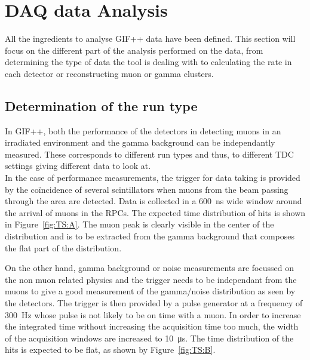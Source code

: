 \section{DAQ data Analysis}
\label{app2:sec:analysis}

	All the ingredients to analyse GIF++ data have been defined. This section will focus on the different part of the analysis performed on the data, from determining the type of data the tool is dealing with to calculating the rate in each detector or reconstructing muon or gamma clusters.

	\subsection{Determination of the run type}
	\label{app2:ssec:runtype}
	
	In GIF++, both the performance of the detectors in detecting muons in an irradiated environment and the gamma background can be independantly measured. These corresponds to different run types and thus, to different TDC settings giving different data to look at.\\
	
	In the case of performance measurements, the trigger for data taking is provided by the coïncidence of several scintillators when muons from the beam passing through the area are detected. Data is collected in a \SI{600}{ns} wide window around the arrival of muons in the RPCs. The expected time distribution of hits is shown in Figure~\ref{fig:TS:A}. The muon peak is clearly visible in the center of the distribution and is to be extracted from the gamma background that composes the flat part of the distribution.
	
	On the other hand, gamma background or noise measurements are focussed on the non muon related physics and the trigger needs to be independant from the muons to give a good measurement of the gamma/noise distribution as seen by the detectors. The trigger is then provided by a pulse generator at a frequency of \SI{300}{Hz} whose pulse is not likely to be on time with a muon. In order to increase the integrated time without increasing the acquisition time too much, the width of the acquisition windows are increased to \SI{10}{\micro s}. The time distribution of the hits is expected to be flat, as shown by Figure~\ref{fig:TS:B}.
	
